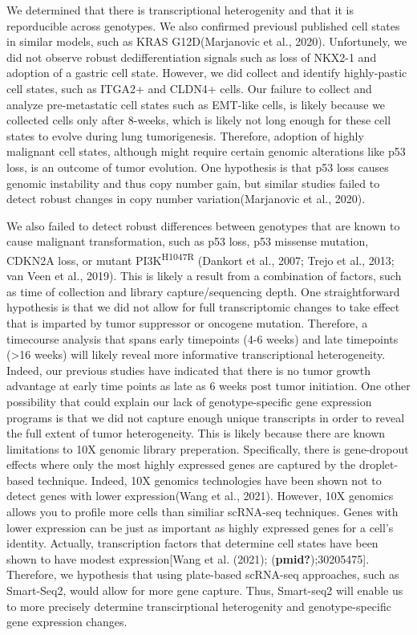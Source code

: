 We determined that there is transcriptional heterogenity and that it is reporducible across genotypes. We also confirmed previousl published cell states in similar models, such as KRAS G12D(Marjanovic et al., 2020). Unfortunely, we did not observe robust dedifferentiation signals such as loss of NKX2-1 and adoption of a gastric cell state. However, we did collect and identify highly-pastic cell states, such as ITGA2+ and CLDN4+ cells. Our failure to collect and analyze pre-metastatic cell states such as EMT-like cells, is likely because we collected cells only after 8-weeks, which is likely not long enough for these cell states to evolve during lung tumorigenesis. Therefore, adoption of highly malignant cell states, although might require certain genomic alterations like p53 loss, is an outcome of tumor evolution. One hypothesis is that p53 loss causes genomic instability and thus copy number gain, but similar studies failed to detect robust changes in copy number variation(Marjanovic et al., 2020).

We also failed to detect robust differences between genotypes that are known to cause malignant transformation, such as p53 loss, p53 missense mutation, CDKN2A loss, or mutant PI3K\textsuperscript{H1047R} (Dankort et al., 2007; Trejo et al., 2013; van Veen et al., 2019). This is likely a result from a combination of factors, such as time of collection and library capture/sequencing depth. One straightforward hypothesis is that we did not allow for full transcriptomic changes to take effect that is imparted by tumor suppressor or oncogene mutation. Therefore, a timecourse analysis that spans early timepoints (4-6 weeks) and late timepoints (\textgreater16 weeks) will likely reveal more informative transcriptional heterogeneity. Indeed, our previous studies have indicated that there is no tumor growth advantage at early time points as late as 6 weeks post tumor initiation. One other possibility that could explain our lack of genotype-specific gene expression programs is that we did not capture enough unique transcripts in order to reveal the full extent of tumor heterogeneity. This is likely because there are known limitations to 10X genomic library preperation. Specifically, there is gene-dropout effects where only the most highly expressed genes are captured by the droplet-based technique. Indeed, 10X genomics technologies have been shown not to detect genes with lower expression(Wang et al., 2021). However, 10X genomics allows you to profile more cells than similiar scRNA-seq techniques. Genes with lower expression can be just as important as highly expressed genes for a cell's identity. Actually, transcription factors that determine cell states have been shown to have modest expression{[}Wang et al. (2021); (\textbf{pmid?});30205475{]}.
Therefore, we hypothesis that using plate-based scRNA-seq approaches, such as Smart-Seq2, would allow for more gene capture. Thus, Smart-seq2 will enable us to more precisely determine transcirptional heterogenity and genotype-specific gene expression changes.


